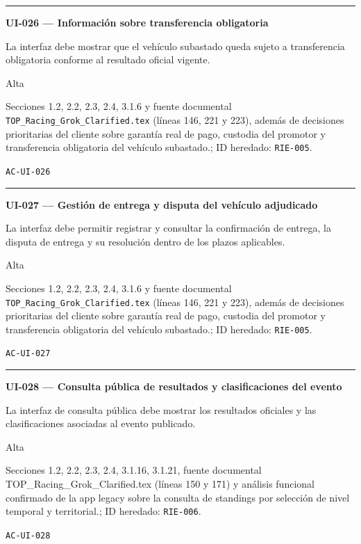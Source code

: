 \documentclass[10pt,letterpaper]{article}
\begin{document}
\vspace{0.25em}\hrule\vspace{0.65em}
\noindent\textbf{UI-026 --- Información sobre transferencia obligatoria}\par
\begin{description}[style=nextline,leftmargin=3.15cm,labelwidth=2.8cm,font=\normalfont\bfseries]
\item[Obligación] La interfaz debe mostrar que el vehículo subastado queda sujeto a transferencia obligatoria conforme al resultado oficial vigente.
\item[Prioridad] Alta
\item[Procedencia] Secciones 1.2, 2.2, 2.3, 2.4, 3.1.6 y fuente documental \texttt{TOP\_Racing\_Grok\_Clarified.tex} (líneas 146, 221 y 223), además de decisiones prioritarias del cliente sobre garantía real de pago, custodia del promotor y transferencia obligatoria del vehículo subastado.; ID heredado: \texttt{RIE-005}.
\item[Verificación] \texttt{AC-UI-026}
\end{description}
\vspace{0.25em}\hrule\vspace{0.65em}
\noindent\textbf{UI-027 --- Gestión de entrega y disputa del vehículo adjudicado}\par
\begin{description}[style=nextline,leftmargin=3.15cm,labelwidth=2.8cm,font=\normalfont\bfseries]
\item[Obligación] La interfaz debe permitir registrar y consultar la confirmación de entrega, la disputa de entrega y su resolución dentro de los plazos aplicables.
\item[Prioridad] Alta
\item[Procedencia] Secciones 1.2, 2.2, 2.3, 2.4, 3.1.6 y fuente documental \texttt{TOP\_Racing\_Grok\_Clarified.tex} (líneas 146, 221 y 223), además de decisiones prioritarias del cliente sobre garantía real de pago, custodia del promotor y transferencia obligatoria del vehículo subastado.; ID heredado: \texttt{RIE-005}.
\item[Verificación] \texttt{AC-UI-027}
\end{description}
\vspace{0.25em}\hrule\vspace{0.65em}
\noindent\textbf{UI-028 --- Consulta pública de resultados y clasificaciones del evento}\par
\begin{description}[style=nextline,leftmargin=3.15cm,labelwidth=2.8cm,font=\normalfont\bfseries]
\item[Obligación] La interfaz de consulta pública debe mostrar los resultados oficiales y las clasificaciones asociadas al evento publicado.
\item[Prioridad] Alta
\item[Procedencia] Secciones 1.2, 2.2, 2.3, 2.4, 3.1.16, 3.1.21, fuente documental TOP\_Racing\_Grok\_Clarified.tex (líneas 150 y 171) y análisis funcional confirmado de la app legacy sobre la consulta de standings por selección de nivel temporal y territorial.; ID heredado: \texttt{RIE-006}.
\item[Verificación] \texttt{AC-UI-028}
\end{description}
\end{document}
